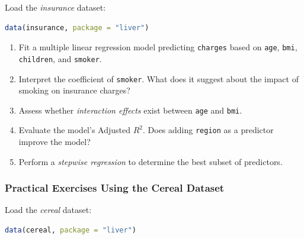 \documentclass[
]{book}
\newcommand{\passthrough}[1]{#1}
\providecommand{\tightlist}{%
  \setlength{\itemsep}{0pt}\setlength{\parskip}{0pt}}
\theoremstyle{definition}
\theoremstyle{definition}
\theoremstyle{definition}
\theoremstyle{definition}
\theoremstyle{remark}
\begin{document}
Load the \emph{insurance} dataset:

\begin{lstlisting}[language=R]
data(insurance, package = "liver")
\end{lstlisting}

\begin{enumerate}
\def\labelenumi{\arabic{enumi}.}
\setcounter{enumi}{14}
\tightlist
\item
  Fit a multiple linear regression model predicting \passthrough{\lstinline!charges!} based on \passthrough{\lstinline!age!}, \passthrough{\lstinline!bmi!}, \passthrough{\lstinline!children!}, and \passthrough{\lstinline!smoker!}.\\
\item
  Interpret the coefficient of \passthrough{\lstinline!smoker!}. What does it suggest about the impact of smoking on insurance charges?\\
\item
  Assess whether \emph{interaction effects} exist between \passthrough{\lstinline!age!} and \passthrough{\lstinline!bmi!}.\\
\item
  Evaluate the model's Adjusted \(R^2\). Does adding \passthrough{\lstinline!region!} as a predictor improve the model?\\
\item
  Perform a \emph{stepwise regression} to determine the best subset of predictors.
\end{enumerate}

\subsubsection*{Practical Exercises Using the Cereal Dataset}\label{practical-exercises-using-the-cereal-dataset}

Load the \emph{cereal} dataset:

\begin{lstlisting}[language=R]
data(cereal, package = "liver")
\end{lstlisting}
\end{document}
